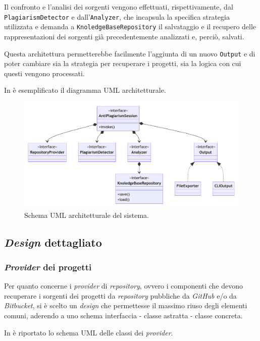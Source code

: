 Il confronto e l'analisi dei sorgenti vengono effettuati, rispettivamente, dal \texttt{PlagiarismDetector} e dall'\texttt{Analyzer}, che incapsula la specifica strategia utilizzata e demanda a \texttt{KnoledgeBaseRepository} il salvataggio e il recupero delle rappresentazioni dei sorgenti già precedentemente analizzati e, perciò, salvati.

Questa architettura permetterebbe facilmente l'aggiunta di un nuovo \texttt{Output} e di poter cambiare sia la strategia per recuperare i progetti, sia la logica con cui questi vengono processati.

In  è esemplificato il diagramma UML architetturale.

\begin{figure}[h!]
    \centering
    \includegraphics[width=\textwidth]{resources/img/02-achitecture.pdf}
    \caption{Schema UML architetturale del sistema.}
    \label{img:02-architecture}
\end{figure}

\subsection{\textit{Design} dettagliato}

\subsubsection*{\textit{Provider} dei progetti}
Per quanto concerne i \textit{provider} di \textit{repository}, ovvero i componenti che devono recuperare i sorgenti dei progetti da \textit{repository} pubbliche da \textit{GitHub} e/o da \textit{Bitbucket}, si è scelto un \textit{design} che permettesse il massimo riuso degli elementi comuni, aderendo a uno schema interfaccia - classe astratta - classe concreta.

In  è riportato lo schema UML delle classi dei \textit{provider}.

